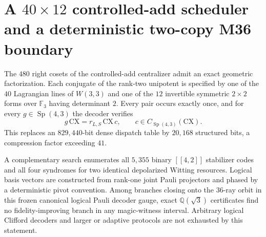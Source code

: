 \section*{A $40\times12$ controlled-add scheduler and a deterministic two-copy M36 boundary}
The $480$ right cosets of the controlled-add centralizer admit an exact geometric
factorization. Each conjugate of the rank-two unipotent is specified by one of the
$40$ Lagrangian lines of $W(3,3)$ and one of the $12$ invertible symmetric
$2\times2$ forms over $\mathbb F_3$ having determinant $2$. Every pair occurs
exactly once, and for every $g\in\operatorname{Sp}(4,3)$ the decoder verifies
\[
 g\,\mathrm{CX}=r_{L,S}\,\mathrm{CX}\,c,
 \qquad c\in C_{\operatorname{Sp}(4,3)}(\mathrm{CX}).
\]
This replaces an $829{,}440$-bit dense dispatch table by $20{,}168$ structured
bits, a compression factor exceeding $41$.

A complementary search enumerates all $5{,}355$ binary $[[4,2]]$ stabilizer codes
and all four syndromes for two identical depolarized Witting resources. Logical
basis vectors are constructed from rank-one joint Pauli projectors and phased by
a deterministic pivot convention. Among branches closing onto the $36$-ray orbit
in this frozen canonical logical Pauli decoder gauge, exact
$\mathbb Q(\sqrt3)$ certificates find no fidelity-improving branch in any
magic-witness interval. Arbitrary logical Clifford decoders and larger or adaptive
protocols are not exhausted by this statement.
